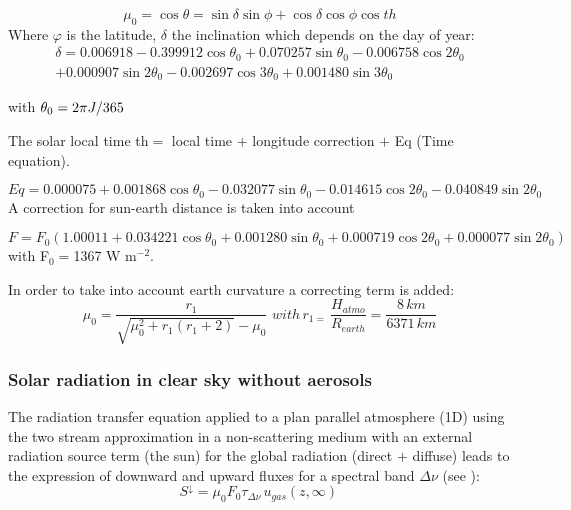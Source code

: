 \begin{equation}
\mu_{0}=\cos \theta =\sin \delta \sin \phi +\cos \delta \cos \phi \cos
{th}
\end{equation}
Where $\varphi $ is the latitude, $\delta $ the inclination which depends on
the day of year:
\begin{multline}
\delta =
0.006918
-0.399912\cos \theta_{0}
+0.070257\sin \theta_{0}
-0.006758\cos 2\theta_{0}\\
+0.000907\sin 2\theta_{0}
-0.002697\cos 3\theta_{0}
+0.001480\sin 3\theta_{0}
\end{multline}

with $\theta_{0}=2\pi J/365\\$

The solar local time th$= $ local time $+$ longitude correction $+$ Eq (Time
equation).

\begin{equation}
Eq=0.000075+0.001868\cos {\theta_{0}-0.032077\sin {\theta_{0}-0.014615\cos
{2\theta_{0}}}}-0.040849\sin {2\theta_{0}}
\end{equation}
A correction for sun-earth distance is taken into account

\begin{equation}
F=F_{0} (1.00011+0.034221\cos {\theta_{0}+0.001280\sin {\theta
_{0}+0.000719\cos {2\theta_{0}}}}+0.000077\sin {2\theta_{0}})
\end{equation}
with F$_{0}=$1367 W m$^{-2}$.

In order to take into account earth curvature a correcting term is
added:
\begin{equation}
\mu_{0}=\frac{r_{1}}{\sqrt {\mu_{0}^{2}+r_{1}(r_{1}+2)} -\mu_{0}}\, \,
with\, r_{1=}\, \frac{H_{atmo}}{R_{earth}}=\frac{8\, km}{6371\, km}
\end{equation}

\subsubsection{Solar radiation in clear sky without aerosols}
The radiation transfer equation applied to a plan parallel atmosphere (1D)
using the two stream approximation in a non-scattering medium with an
external radiation source term (the sun) for the global radiation (direct
$+$ diffuse) leads to the expression of downward and upward fluxes for a
spectral band $\Delta \nu $ (see \cite{Lacis:1974}):
\begin{equation}
S^\downarrow =\mu_{0} F_{0} \tau_{\Delta \nu}\, u_{gas}\left( z,\infty
\right)\,
\end{equation}

